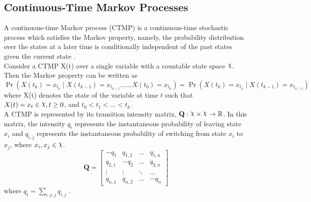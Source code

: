 \subsection{Continuous-Time Markov Processes}
A continuous-time Markov process (CTMP) is a continuous-time stochastic process which satisfies the Markov property, namely, the probability distribution over the states at a later time is conditionally independent of the past states given the current state \cite{Cohn2010a}. \\
Consider a CTMP X(t) over a single variable with a countable state space $ \rchi $. Then the Markov property can be written as
\begin{equation}
\operatorname{Pr}\left(X(t_{k})=x_{t_{k}} \mid X(t_{k-1})=x_{t_{k-1}}, \ldots, X(t_{0})=x_{t_{0}}\right)=\operatorname{Pr}\left(X(t_{k})=x_{t_{k}} \mid X(t_{k-1})=x_{t_{k-1}}\right)
\end{equation}
where X(t) denotes the state of the variable at time $ t $ such that $ X(t)=x_t \in \rchi, t \geq 0$, and $ t_0<t_1<...<t_k $.\\
A CTMP is represented by its transition intensity matrix, $ \textbf{Q} : \rchi \times \rchi \rightarrow \mathbb{R}$. In this matrix, the intensity $ q_{i} $ represents the instantaneous probability of leaving state $ x_{i} $ and $ q_{i,j} $ represents the instantaneous probability of switching from state $ x_{i} $ to $ x_{j} $, where $ x_i, x_j \in \rchi $. 
\begin{equation}
\textbf{Q} = 
\begin{bmatrix}
-q_{1} & q_{1,2} &     {\hdots}  & q_{1,n} \\
q_{2,1} & -q_{2} &     {\hdots}  & q_{2,n}  \\
{\vdots}  &     {\vdots}  &     {\ddots}  & {\hdots}  \\
q_{n,1} &  q_{n,2} &  {\hdots} & -q_{n}
\end{bmatrix}
\label{eq:Q_matrix}
\end{equation}
where $ q_{i} = \sum_{i \neq j} q_{i,j}$ \cite{Nodelman1995}.

